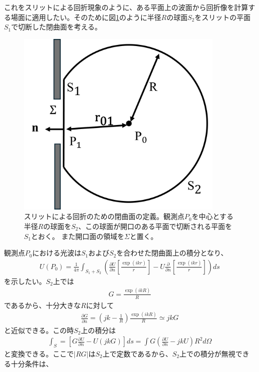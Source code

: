 \documentclass[a4paper,11pt,uplatex]{jsbook}
\begin{document}
これをスリットによる回折現象のように、ある平面上の波面から回折像を計算する場面に適用したい。そのために図\ref{fig:diff_kir}のように半径$R$の球面$S_2$をスリットの平面$S_1$で切断した閉曲面を考える。
\begin{figure}[h]
  \centering
  \includegraphics[width=10cm]{image/2-diffraction_kir.png}
  \caption[スリットによる回折の模式図]{スリットによる回折のための閉曲面の定義。観測点$P_0$を中心とする半径$R$の球面を$S_2$、この球面が開口のある平面で切断される平面を$S_1$とおく。
  また開口面の領域を$\Sigma$と置く。}\label{fig:diff_kir}
\end{figure}
観測点$P_0$における光波は$S_1$および$S_2$を合わせた閉曲面上の積分となり、
\begin{eqnarray}
  U(P_0) = \frac{1}{4\pi}\int_{S_1+S_2} \left( \frac{\partial U}{\partial n} \left[ \frac{\exp(ikr)}{r} \right] - U\frac{\partial}{\partial n} \left[ \frac{\exp(ikr)}{r}\right] \right) ds
\end{eqnarray}
を示したい。$S_2$上では
\begin{eqnarray}
  G = \frac{\exp(ikR)}{R} 
\end{eqnarray}
であるから、十分大きな$R$に対して
\begin{eqnarray}
  \frac{\partial G}{\partial n} = \left( jk-\frac{1}{R}\right)\frac{\exp(ikR)}{R} \simeq jkG
\end{eqnarray}
と近似できる。この時$S_2$上の積分は
\begin{eqnarray}
  \int_S  = \left[ G\frac{\partial U}{\partial n} - U (jkG)\right]ds = \int G(\frac{\partial U}{\partial n} -jkU)R^2d\Omega
\end{eqnarray}
と変換できる。ここで$|RG|$は$S_2$上で定数であるから、$S_2$上での積分が無視できる十分条件は、
\end{document}
